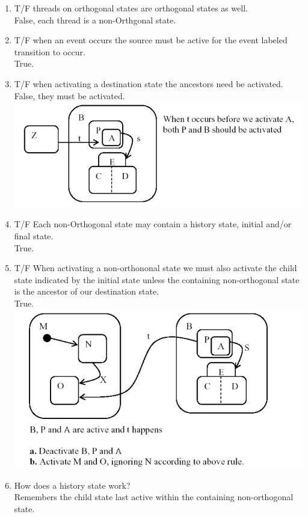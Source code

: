 \documentclass[10pt]{article}
\begin{document}
\begin{enumerate}
      \item T/F threads on orthogonal states are orthogonal states as well.\\
            False, each thread is a non-Orthgonal state.\\

      \item T/F when an event occurs the source must be active for the event labeled transition to occur.\\
            True.\\

      \item T/F when activating a destination state the ancestors need be activated.\\
            False, they must be activated.\\
            \includegraphics*{ort.png}
      \item T/F Each non-Orthogonal state may contain a history state, initial and/or final state.\\
            True.\\

      \item T/F When activating a non-orthononal state we must also activate the child state indicated by the initial state unless the containing non-orthogonal state
            is the ancestor of our destination state.\\
            True.\\
            \includegraphics*[scale=.34]{statetrans.png}\\
      \item How does a history state work?\\
            Remembers the child state last active within the containing non-orthogonal state.\\


\end{enumerate}
\end{document}
